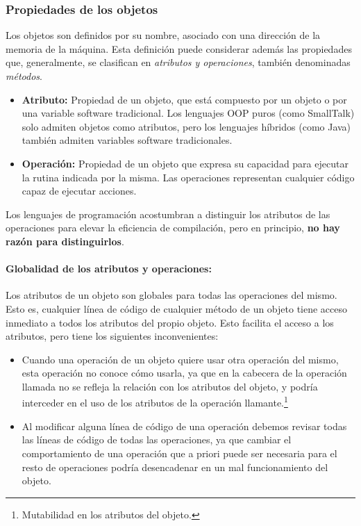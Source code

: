 \subsubsection{Propiedades de los objetos} Los objetos son definidos
por su nombre, asociado con una dirección de la memoria de la máquina.
Esta definición puede considerar además las propiedades que,
generalmente, se clasifican en \emph{atributos y operaciones}, también
denominadas \emph{métodos}.
\begin{itemize}
\item \textbf{Atributo:} Propiedad de un objeto, que está compuesto
  por un objeto o por una variable software tradicional. Los lenguajes
  OOP puros (como SmallTalk) solo admiten objetos como atributos, pero
  los lenguajes híbridos (como Java) también admiten variables software
  tradicionales.
\item \textbf{Operación: } Propiedad de un objeto que expresa su
  capacidad para ejecutar la rutina indicada por la misma. Las
  operaciones representan cualquier código capaz de ejecutar acciones.
\end{itemize}

\vspace{5mm}

Los lenguajes de programación acostumbran a distinguir los atributos
de las operaciones para elevar la eficiencia de compilación, pero en
principio, \textbf{no hay razón para distinguirlos}.

\vspace{5mm}

\paragraph{Globalidad de los atributos y operaciones:} Los atributos
de un objeto son globales para todas las operaciones del mismo. Esto
es, cualquier línea de código de cualquier método de un objeto tiene
acceso inmediato a todos los atributos del propio objeto. Esto
facilita el acceso a los atributos, pero tiene los siguientes
inconvenientes:
\begin{itemize}
\item Cuando una operación de un objeto quiere usar otra operación del
  mismo, esta operación no conoce cómo usarla, ya que en la cabecera de
  la operación llamada no se refleja la relación con los atributos del
  objeto, y podría interceder en el uso de los atributos de la operación
  llamante.\footnote{Mutabilidad en los atributos del objeto.}
\item Al modificar alguna línea de código de una operación debemos
  revisar todas las líneas de código de todas las operaciones, ya que
  cambiar el comportamiento de una operación que a priori puede ser
  necesaria para el resto de operaciones podría desencadenar en un mal
  funcionamiento del objeto.
\end{itemize}

